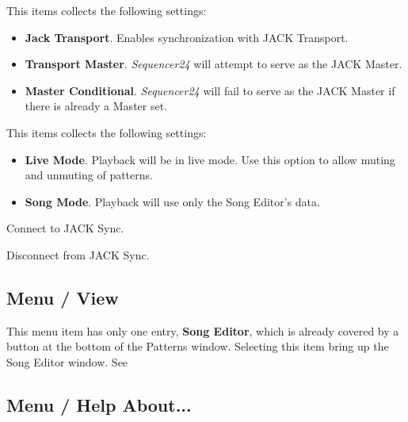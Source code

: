    \setcounter{ItemCounter}{0}      %

   This items collects the following settings:

   \begin{itemize}
      \item \textbf{Jack Transport}.
         Enables synchronization with JACK Transport.
      \item \textbf{Transport Master}.
         \textsl{Sequencer24} will attempt to serve as the JACK Master.
      \item \textbf{Master Conditional}.
         \textsl{Sequencer24} will fail to serve as the JACK Master if there is
         already a Master set.
   \end{itemize}

   This items collects the following settings:

   \begin{itemize}
      \item \textbf{Live Mode}.
         Playback will be in live mode.  Use this option to allow muting and
         unmuting of patterns.
      \item \textbf{Song Mode}.
         Playback will use only the Song Editor's data.
   \end{itemize}

   Connect to JACK Sync.

   Disconnect from JACK Sync.

\subsection{Menu / View}
\label{subsec:seq24_menu_view}

   This menu item has only one entry, \textbf{Song Editor}, 
   which is already covered by a button at the bottom of the Patterns
   window.  Selecting this item bring up the Song Editor window.
   See 

\subsection{Menu / Help About...}
\label{subsec:seq24_menu_about}


